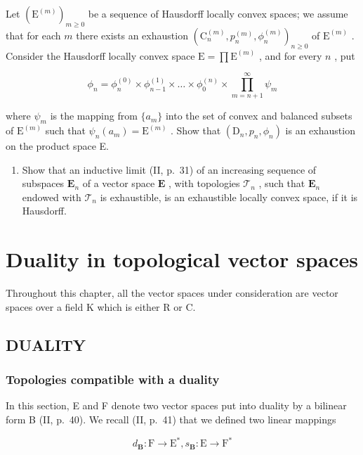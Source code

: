 Let \((\mathrm{E}^{(m)})_{m\geqslant 0}\) be a sequence of Hausdorff locally convex spaces; we assume that for each \(m\) there exists an exhaustion \((\mathrm{C}_n^{(m)},p_n^{(m)},\phi_n^{(m)})_{n\geqslant 0}\) of \(\mathrm{E}^{(m)}\) . Consider the Hausdorff locally convex space \(\mathrm{E} = \prod \mathrm{E}^{(m)}\) , and for every \(n\) , put

\[
\phi_ {n} = \phi_ {n} ^ {(0)} \times \phi_ {n - 1} ^ {(1)} \times \dots \times \phi_ {0} ^ {(n)} \times \prod_ {m = n + 1} ^ {\infty} \psi_ {m}
\]

where \(\psi_{m}\) is the mapping from \(\{a_m\}\) into the set of convex and balanced subsets of \(\mathrm{E}^{(m)}\) such that \(\psi_{n}(a_{m}) = \mathrm{E}^{(m)}\) . Show that \((\mathrm{D}_n,p_n,\phi_n)\) is an exhaustion on the product space E.

\begin{enumerate}
\def\labelenumi{\arabic{enumi})}
\setcounter{enumi}{5}
\tightlist
\item
  Show that an inductive limit (II, p.~31) of an increasing sequence of subspaces \(\mathbf{E}_n\) of a vector space \(\mathbf{E}\) , with topologies \(\mathcal{T}_n\) , such that \(\mathbf{E}_n\) endowed with \(\mathcal{T}_n\) is exhaustible, is an exhaustible locally convex space, if it is Hausdorff.
\end{enumerate}

\chapter{Duality in topological vector spaces}

Throughout this chapter, all the vector spaces under consideration are vector spaces over a field K which is either R or C.

\section{DUALITY}

\subsection{Topologies compatible with a duality}

In this section, E and F denote two vector spaces put into duality by a bilinear form B (II, p.~40). We recall (II, p.~41) that we defined two linear mappings

\[
d _ {\mathbf {B}}: \mathrm{F} \to \mathrm{E} ^ {*}, s _ {\mathbf {B}}: \mathrm{E} \to \mathrm{F} ^ {*}
\]

